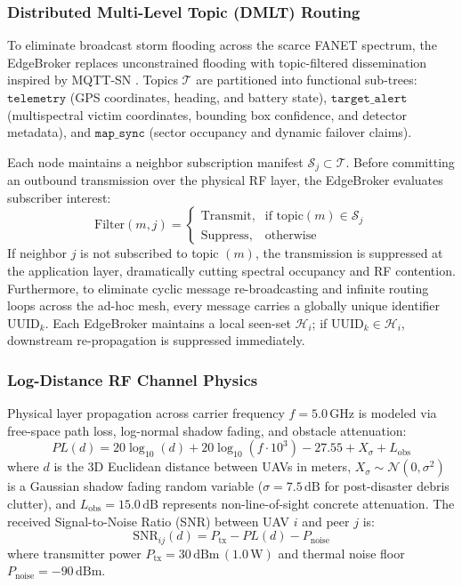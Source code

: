 \documentclass[conference]{IEEEtran}
\begin{document}
\subsubsection{Distributed Multi-Level Topic (DMLT) Routing}
To eliminate broadcast storm flooding across the scarce FANET spectrum, the EdgeBroker replaces unconstrained flooding with topic-filtered dissemination inspired by MQTT-SN \cite{ref21}. Topics $\mathcal{T}$ are partitioned into functional sub-trees: $\texttt{telemetry}$ (GPS coordinates, heading, and battery state), $\texttt{target\_alert}$ (multispectral victim coordinates, bounding box confidence, and detector metadata), and $\texttt{map\_sync}$ (sector occupancy and dynamic failover claims).

Each node maintains a neighbor subscription manifest $\mathcal{S}_j \subset \mathcal{T}$. Before committing an outbound transmission over the physical RF layer, the EdgeBroker evaluates subscriber interest:
\begin{equation}
    \text{Filter}(m, j) = \begin{cases}
        \text{Transmit}, & \text{if } \text{topic}(m) \in \mathcal{S}_j \\
        \text{Suppress}, & \text{otherwise}
    \end{cases}
\end{equation}
If neighbor $j$ is not subscribed to topic $(m)$, the transmission is suppressed at the application layer, dramatically cutting spectral occupancy and RF contention. Furthermore, to eliminate cyclic message re-broadcasting and infinite routing loops across the ad-hoc mesh, every message carries a globally unique identifier $\text{UUID}_k$. Each EdgeBroker maintains a local seen-set $\mathcal{H}_i$; if $\text{UUID}_k \in \mathcal{H}_i$, downstream re-propagation is suppressed immediately.

\subsubsection{Log-Distance RF Channel Physics}
Physical layer propagation across carrier frequency $f = 5.0\,\text{GHz}$ is modeled via free-space path loss, log-normal shadow fading, and obstacle attenuation:
\begin{equation}
    PL(d) = 20 \log_{10}(d) + 20 \log_{10}(f \cdot 10^3) - 27.55 + X_\sigma + L_{\text{obs}}
\end{equation}
where $d$ is the 3D Euclidean distance between UAVs in meters, $X_\sigma \sim \mathcal{N}(0, \sigma^2)$ is a Gaussian shadow fading random variable ($\sigma = 7.5\,\text{dB}$ for post-disaster debris clutter), and $L_{\text{obs}} = 15.0\,\text{dB}$ represents non-line-of-sight concrete attenuation. The received Signal-to-Noise Ratio (SNR) between UAV $i$ and peer $j$ is:
\begin{equation}
    \text{SNR}_{ij}(d) = P_{\text{tx}} - PL(d) - P_{\text{noise}}
\end{equation}
where transmitter power $P_{\text{tx}} = 30\,\text{dBm}\,(1.0\,\text{W})$ and thermal noise floor $P_{\text{noise}} = -90\,\text{dBm}$.
\end{document}
